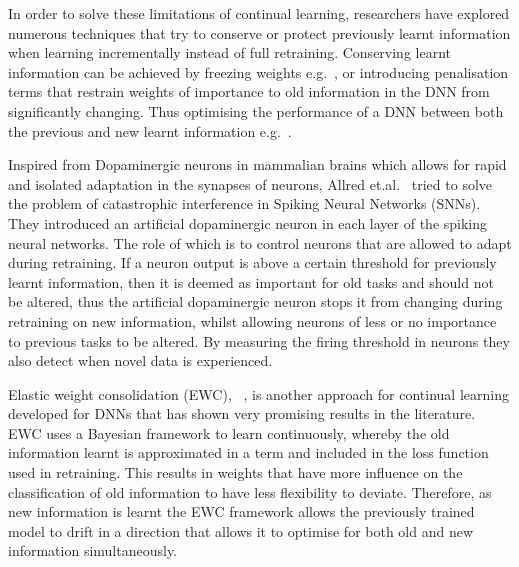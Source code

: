 In order to solve these limitations of continual learning, researchers have explored numerous techniques that try to conserve or protect previously learnt information when learning incrementally instead of full retraining.
%
Conserving learnt information can be achieved by freezing weights e.g.~\cite{Wang2017,Li2018c}, or introducing penalisation terms that 
restrain weights of importance to old information in the DNN from significantly changing. 
%
Thus optimising the performance of a DNN between both the previous and new learnt information e.g.~\cite{Kirkpatrick2017,Zenke2017,Maltoni2019a}.

Inspired from Dopaminergic neurons in mammalian brains which allows for rapid and isolated adaptation in the synapses of neurons, Allred et.al.~\cite{Allred2020} tried to solve the problem of catastrophic interference in Spiking Neural Networks (SNNs).
%
They introduced an artificial dopaminergic neuron in each layer of the spiking neural networks. The role of which is to control neurons that are allowed to adapt during retraining. 
%
If a neuron output is above a certain threshold for previously learnt information, then it is deemed as important for old tasks and should not be altered, thus the artificial dopaminergic neuron stops it from changing during retraining on new information, whilst allowing neurons of less or no importance to previous tasks to be altered.
%
By measuring the firing threshold in neurons they also detect when novel data is experienced.

Elastic weight consolidation (EWC), ~\cite{Kirkpatrick2017}, is another approach for continual learning developed for DNNs that has shown very promising results in the literature.
%
EWC uses a Bayesian framework to learn continuously, whereby the old information learnt is approximated in a term and included in the loss function used in retraining.  
%
This results in weights that have more influence on the classification of old information to 
have less flexibility to deviate.  Therefore, as new information is learnt the EWC framework allows the previously trained model to drift in a direction that allows it to optimise for both old and new information simultaneously.   


